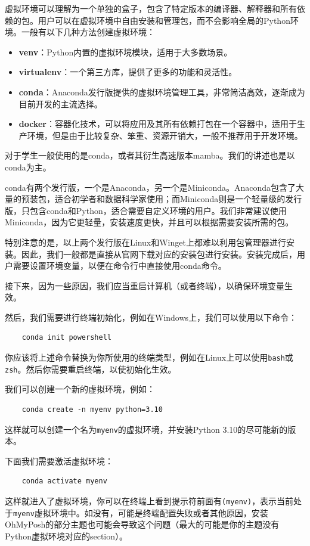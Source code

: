 \documentclass[../main.tex]{subfiles}
\begin{document}
虚拟环境可以理解为一个单独的盒子，包含了特定版本的编译器、解释器和所有依赖的包。用户可以在虚拟环境中自由安装和管理包，而不会影响全局的Python环境。一般有以下几种方法创建虚拟环境：
\begin{itemize}
  \item \textbf{venv}：Python内置的虚拟环境模块，适用于大多数场景。
  \item \textbf{virtualenv}：一个第三方库，提供了更多的功能和灵活性。
  \item \textbf{conda}：Anaconda发行版提供的虚拟环境管理工具，非常简洁高效，逐渐成为目前开发的主流选择。
  \item \textbf{docker}：容器化技术，可以将应用及其所有依赖打包在一个容器中，适用于生产环境，但是由于比较复杂、笨重、资源开销大，一般不推荐用于开发环境。
\end{itemize}

对于学生一般使用的是conda，或者其衍生高速版本mamba。我们的讲述也是以conda为主。

conda有两个发行版，一个是Anaconda，另一个是Miniconda。Anaconda包含了大量的预装包，适合初学者和数据科学家使用；而Miniconda则是一个轻量级的发行版，只包含conda和Python，适合需要自定义环境的用户。我们非常建议使用Miniconda，因为它更轻量，安装速度更快，并且可以根据需要安装所需的包。

特别注意的是，以上两个发行版在Linux和Winget上都难以利用包管理器进行安装。因此，我们一般都是直接从官网下载对应的安装包进行安装。安装完成后，用户需要设置环境变量，以便在命令行中直接使用conda命令。

接下来，因为一些原因，我们应当重启计算机（或者终端），以确保环境变量生效。

然后，我们需要进行终端初始化，例如在Windows上，我们可以使用以下命令：
\begin{verbatim}
    conda init powershell
\end{verbatim}

你应该将上述命令替换为你所使用的终端类型，例如在Linux上可以使用\texttt{bash}或\texttt{zsh}。然后你需要重启终端，以使初始化生效。

我们可以创建一个新的虚拟环境，例如：
\begin{verbatim}
    conda create -n myenv python=3.10
\end{verbatim}
这样就可以创建一个名为\texttt{myenv}的虚拟环境，并安装Python 3.10的尽可能新的版本。

下面我们需要激活虚拟环境：
\begin{verbatim}
    conda activate myenv
\end{verbatim}
这样就进入了虚拟环境，你可以在终端上看到提示符前面有\texttt{(myenv)}，表示当前处于\texttt{myenv}虚拟环境中。如没有，可能是终端配置失败或者其他原因，安装OhMyPosh的部分主题也可能会导致这个问题（最大的可能是你的主题没有Python虚拟环境对应的section）。
\end{document}
